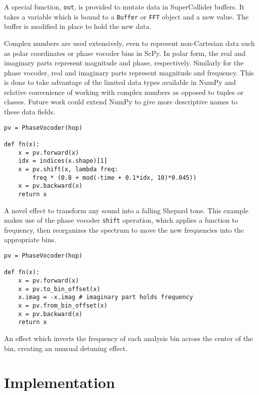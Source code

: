 \documentclass{article}
\begin{document}
A special function, \texttt{out}, is provided to mutate data in SuperCollider buffers. It takes a
variable which is bound to a \texttt{Buffer} or \texttt{FFT} object and a new value. The buffer is
modified in place to hold the new data.

Complex numbers are used extensively, even to represent non-Cartesian data such as polar
coordinates or phase vocoder bins in ScPy. In polar form, the real and imaginary parts represent
magnitude and phase, respectively. Similarly for the phase vocoder, real and imaginary parts
represent magnitude and frequency. This is done to take advantage of the limited data types
available in NumPy and relative convenience of working with complex numbers as opposed to tuples or
classes. Future work could extend NumPy to give more descriptive names to these data fields.

\begin{listing}[ht]
    \begin{verbatim}
pv = PhaseVocoder(hop)

def fn(x):
    x = pv.forward(x)
    idx = indices(x.shape)[1]
    x = pv.shift(x, lambda freq:
        freq * (0.8 + mod(-time + 0.1*idx, 10)*0.045))
    x = pv.backward(x)
    return x
    \end{verbatim}
    \caption{A novel effect to transform any sound into a falling Shepard tone. This example makes
    use of the phase vocoder \texttt{shift} operation, which applies a function to frequency, then
    reorganizes the spectrum to move the new frequencies into the appropriate bins.}
    \label{lst:shepard}
\end{listing}

\begin{listing}[ht]
    \begin{verbatim}
pv = PhaseVocoder(hop)

def fn(x):
    x = pv.forward(x)
    x = pv.to_bin_offset(x)
    x.imag = -x.imag # imaginary part holds frequency
    x = pv.from_bin_offset(x)
    x = pv.backward(x)
    return x
    \end{verbatim}
    \caption{An effect which inverts the frequency of each analysis bin across the center of
    the bin, creating an unusual detuning effect.}
    \label{lst:binflipper}
\end{listing}

\section{Implementation}\label{sec:implementation}
\end{document}
